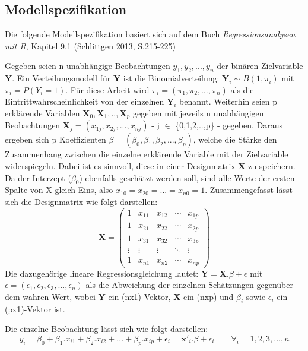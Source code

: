 \documentclass[12pt,]{article}
\begin{document}
\subsection{Modellspezifikation}\label{modellspezifikation}

Die folgende Modellspezifikation basiert sich auf dem Buch
\emph{Regressionsanalysen mit R}, Kapitel 9.1 (Schlittgen 2013,
S.215-225)

Gegeben seien n unabhängige Beobachtungen \(y_1, y_2, ...,y_n\) der
binären Zielvariable \(\mathbf{Y}\). Ein Verteilungsmodell für
\(\mathbf{Y}\) ist die Binomialverteilung:
\(\mathbf{Y}_i \sim B(1, \pi_i)\) mit \(\pi_i = P(Y_i = 1)\). Für diese
Arbeit wird \(\pi_i = (\pi_1, \pi_2, ..., \pi_n)\) als die
Eintrittwahrscheinlichkeit von der einzelnen \(\mathbf{Y}_i\) benannt.
Weiterhin seien p erklärende Variablen
\(\mathbf{X}_0,\mathbf{X}_1,..,\mathbf{X}_p\) gegeben mit jeweils n
unabhängigen Beobachtungen
\(\mathbf{X}_j = (x_{1j}, x_{2j},..., x_{nj})\) - j \(\in\)
\{0,1,2,..,p\} - gegeben. Daraus ergeben sich p Koeffizienten
\(\beta = (\beta_0, \beta_1, \beta_2,..., \beta_p)\), welche die Stärke
den Zusammenhang zwischen die einzelne erklärende Variable mit der
Zielvariable widerspiegeln. Dabei ist es sinnvoll, diese in einer
Designmatrix \(\mathbf{X}\) zu speichern. Da der Interzept (\(\beta_0\))
ebenfalls geschätzt werden soll, sind alle Werte der ersten Spalte von X
gleich Eins, also \(x_{10} = x_{20} = ... = x_{n0} = 1\).
Zusammengefasst lässt sich die Designmatrix wie folgt darstellen: \[
\mathbf{X} =
 \begin{pmatrix}
    1 & x_{11} & x_{12} & \cdots & x_{1p} \\
    1 & x_{21} & x_{22} & \cdots & x_{2p} \\
    1 & x_{31} & x_{32} & \cdots & x_{3p} \\
    \vdots  & \vdots  & \vdots & \ddots & \vdots \\
    1 & x_{n1} & x_{n2} & \cdots & x_{np}
 \end{pmatrix}
\] Die dazugehörige lineare Regressionsgleichung lautet:
\(\mathbf{Y} = \mathbf{X}.\beta + \epsilon\) mit
\(\epsilon = (\epsilon_1, \epsilon_2, \epsilon_3, ..., \epsilon_n)\) als
die Abweichung der einzelnen Schätzungen gegenüber dem wahren Wert,
wobei \(\mathbf{Y}\) ein (nx1)-Vektor, \(\mathbf{X}\) ein (nxp) und
\(\beta_i\) sowie \(\epsilon_i\) ein (px1)-Vektor ist.

Die einzelne Beobachtung lässt sich wie folgt darstellen: \[
y_i = \beta_0 + \beta_1.x_{i1} + \beta_2.x_{i2} + ... + \beta_p.x_{ip} + \epsilon_i = \mathbf{x'}_i.\beta + \epsilon_i \qquad \forall_i = 1,2,3,...,n
\]
\end{document}
